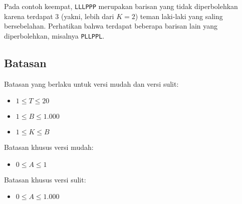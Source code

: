 \documentclass[../main_problemset.tex]{subfiles} %
\begin{document}
Pada contoh keempat, \texttt{LLLPPP} merupakan barisan yang tidak diperbolehkan karena terdapat 3 (yakni, lebih dari $ K=2 $) teman laki-laki yang saling bersebelahan. Perhatikan bahwa terdapat beberapa barisan lain yang diperbolehkan, misalnya \texttt{PLLPPL}.

\pagebreak
\subsection*{Batasan}

Batasan yang berlaku untuk versi mudah dan versi sulit:

\begin{itemize}
	\item $ 1 \le T \le 20 $
	\item $ 1 \le B \le 1.000 $
	\item $ 1 \le K \le B $
\end{itemize}

Batasan khusus versi mudah:

\begin{itemize}
	\item $0 \le A \le 1$
\end{itemize}

Batasan khusus versi sulit:

\begin{itemize}
	\item $0 \le A \le 1.000$
\end{itemize}
\end{document}
